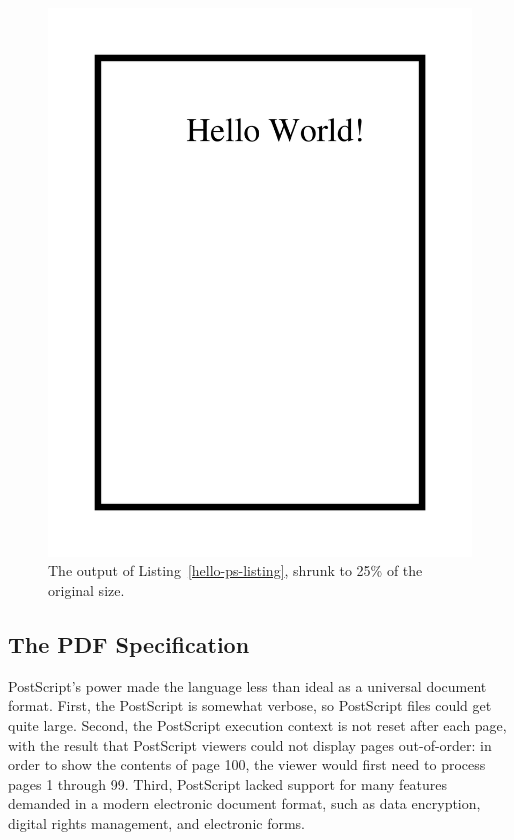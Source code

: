 \begin{figure}
\includegraphics[scale=.25]{ch-pdf/hello-ps.pdf}
\caption{The output of Listing~\ref{hello-ps-listing}, shrunk to 25\% of
  the original size.}\label{hello-ps-figure}
\end{figure}

\subsection{The PDF Specification}

PostScript's power made the language less than ideal as a universal
document format. First, the PostScript is somewhat verbose, so
PostScript files could get quite large. Second, the PostScript
execution context is not reset after each page, with the result that
PostScript viewers could not display pages out-of-order: in order to
show the contents of page 100, the viewer would first need to process
pages 1 through 99. Third, PostScript lacked support for many features
demanded in a modern electronic document format, such as data
encryption, digital rights management, and electronic forms.

